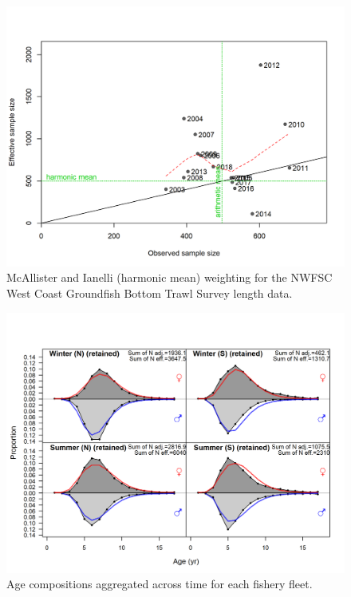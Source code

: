 \documentclass[12pt,]{article}
\begin{document}
\FloatBarrier

\begin{figure}
\centering
\includegraphics{r4ss/plots_mod1/comp_lenfit_sampsize_flt7mkt0.png}
\caption{McAllister and Ianelli (harmonic mean) weighting for the NWFSC
West Coast Groundfish Bottom Trawl Survey length data.
\label{fig:harm_mean_nwfsc}}
\end{figure}

\FloatBarrier

\begin{figure}
\centering
\includegraphics{r4ss/plots_mod1/comp_agefit__aggregated_across_time.png}
\caption{Age compositions aggregated across time for each fishery fleet.
\label{fig:age_agg}}
\end{figure}
\end{document}
